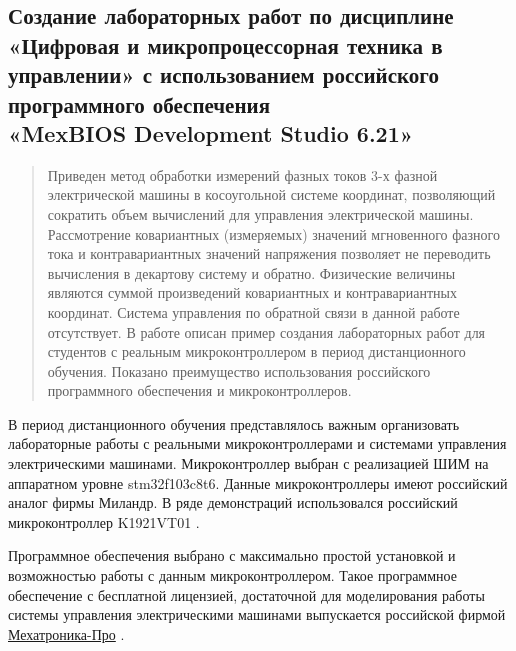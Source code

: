\documentclass[a4paper]{article}
\title{} %
\author{Лиховская В.Д.(студ), Домнин А.В.(студ), Прокшин А.Н.}
\date{Март 2021}
\begin{document}
\renewcommand{\abstractname}{} %
\maketitle

\subsection*{Создание лабораторных работ по дисциплине «Цифровая и микропроцессорная техника в управлении» с использованием российского программного обеспечения 
\\
«MexBIOS Development Studio 6.21»
}

\begin{abstract}
Приведен метод обработки измерений фазных токов 3-х фазной электрической машины в косоугольной системе координат, позволяющий сократить объем вычислений для управления электрической машины.
Рассмотрение ковариантных (измеряемых) значений мгновенного фазного тока и контравариантных значений напряжения позволяет не переводить вычисления в декартову систему и обратно. Физические величины
являются суммой произведений ковариантных и контравариантных координат. Система управления по обратной связи в данной работе отсутствует. В работе описан пример создания лабораторных работ для студентов с
реальным микроконтроллером в период дистанционного обучения.  Показано преимущество использования российского программного обеспечения и микроконтроллеров.
\end{abstract}

В период дистанционного обучения представлялось важным организовать лабораторные работы с реальными
микроконтроллерами и системами управления электрическими машинами.
Микроконтроллер выбран с реализацией ШИМ на аппаратном уровне stm32f103c8t6. 
%
Данные микроконтроллеры имеют российский аналог фирмы Миландр. В ряде демонстраций использовался российский микроконтроллер K1921VT01 \cite{K192101VT}.


Программное обеспечения выбрано с максимально простой установкой
и возможностью работы с данным микроконтроллером. Такое программное обеспечение с бесплатной
лицензией, достаточной для моделирования работы системы управления электрическими машинами
выпускается российской фирмой 
\href{https://mechatronica-pro.com/ru/about}{Мехатроника-Про} \cite{MexBios}.
\end{document}
